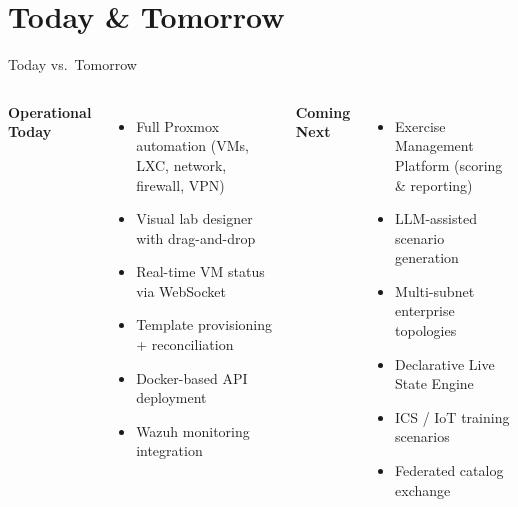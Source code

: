 \documentclass[aspectratio=169]{beamer}
\begin{document}
\section{Today \& Tomorrow}

\begin{frame}{Today vs.\ Tomorrow}
  \begin{columns}[T]
    {\textbf{\faCheckCircle\; Operational Today}}
    \begin{itemize}
      \item Full Proxmox automation (VMs, LXC, network, firewall, VPN)
      \item Visual lab designer with drag-and-drop
      \item Real-time VM status via WebSocket
      \item Template provisioning + reconciliation
      \item Docker-based API deployment
      \item Wazuh monitoring integration
    \end{itemize}

    {\textbf{\faRocket\; Coming Next}}
    \begin{itemize}
      \item Exercise Management Platform (scoring \& reporting)
      \item LLM-assisted scenario generation
      \item Multi-subnet enterprise topologies
      \item Declarative Live State Engine
      \item ICS / IoT training scenarios
      \item Federated catalog exchange
    \end{itemize}
  \end{columns}
\end{frame}
\end{document}
